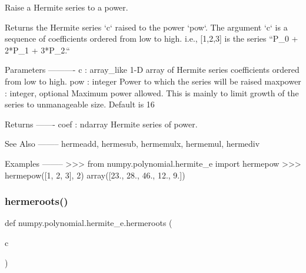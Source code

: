 \begin{DoxyVerb}Raise a Hermite series to a power.

Returns the Hermite series `c` raised to the power `pow`. The
argument `c` is a sequence of coefficients ordered from low to high.
i.e., [1,2,3] is the series  ``P_0 + 2*P_1 + 3*P_2.``

Parameters
----------
c : array_like
    1-D array of Hermite series coefficients ordered from low to
    high.
pow : integer
    Power to which the series will be raised
maxpower : integer, optional
    Maximum power allowed. This is mainly to limit growth of the series
    to unmanageable size. Default is 16

Returns
-------
coef : ndarray
    Hermite series of power.

See Also
--------
hermeadd, hermesub, hermemulx, hermemul, hermediv

Examples
--------
>>> from numpy.polynomial.hermite_e import hermepow
>>> hermepow([1, 2, 3], 2)
array([23.,  28.,  46.,  12.,   9.])\end{DoxyVerb}
 \mbox{\label{namespacenumpy_1_1polynomial_1_1hermite__e_add2d39c957e8508d0f99e0fc9738684b}} 
\subsubsection{\texorpdfstring{hermeroots()}{hermeroots()}}
{\footnotesize\ttfamily def numpy.\+polynomial.\+hermite\+\_\+e.\+hermeroots (\begin{DoxyParamCaption}\item[{}]{c }\end{DoxyParamCaption})}

